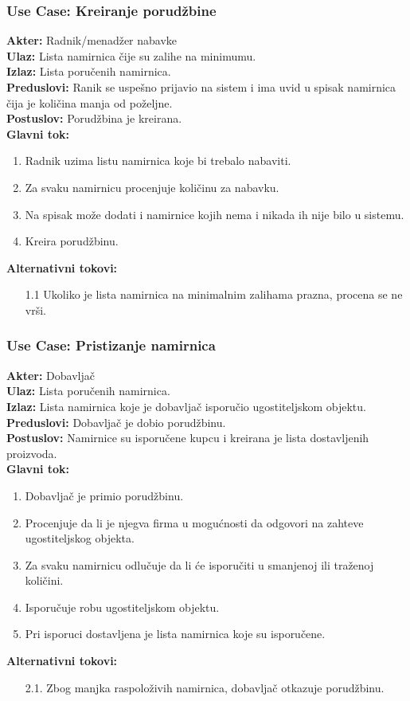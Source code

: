 \documentclass{article}
\begin{document}
\subsubsection{\textbf{Use Case}: Kreiranje porudžbine}
\textbf{Akter:} Radnik/menadžer nabavke\\
\textbf{Ulaz:} Lista namirnica čije su zalihe na minimumu.\\
\textbf{Izlaz:} Lista poručenih namirnica.\\
\textbf{Preduslovi:} Ranik se uspešno prijavio na sistem i ima uvid u spisak namirnica čija je količina manja od poželjne.\\
\textbf{Postuslov:} Porudžbina je kreirana.\\
\textbf{Glavni tok:} 
\begin{enumerate}
	\item Radnik uzima listu namirnica koje bi trebalo nabaviti.
	\item Za svaku namirnicu procenjuje količinu za nabavku. 
	\item Na spisak može dodati i namirnice kojih nema i nikada ih nije bilo u sistemu. 
	\item Kreira porudžbinu.
\end{enumerate}
\textbf{Alternativni tokovi:}
\begin{itemize}
\item[1.1] Ukoliko je lista namirnica na minimalnim zalihama prazna, procena se ne vrši. 
\end{itemize}

\subsubsection{\textbf{Use Case}:  Pristizanje namirnica}
\textbf{Akter:} Dobavljač\\
\textbf{Ulaz:} Lista poručenih namirnica.\\
\textbf{Izlaz:} Lista namirnica koje je dobavljač isporučio ugostiteljskom objektu.\\
\textbf{Preduslovi:} Dobavljač je dobio porudžbinu.\\
\textbf{Postuslov:} Namirnice su isporučene kupcu i kreirana je lista dostavljenih proizvoda.\\
\textbf{Glavni tok:} 
\begin{enumerate}
	\item Dobavljač je primio porudžbinu.
	\item Procenjuje da li je njegva firma u mogućnosti da odgovori na zahteve ugostiteljskog objekta.
	\item Za svaku namirnicu odlučuje da li će isporučiti u smanjenoj ili traženoj količini.
	\item Isporučuje robu ugostiteljskom objektu.
	\item Pri isporuci dostavljena je lista namirnica koje su isporučene.
\end{enumerate}
\textbf{Alternativni tokovi:} 
\begin{itemize}
\item[2.1.] Zbog manjka raspoloživih namirnica, dobavljač otkazuje porudžbinu.
\end{itemize}
\end{document}
